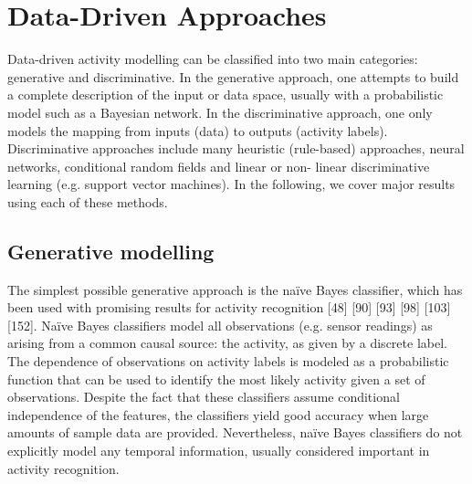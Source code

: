 \section{Data-Driven Approaches}
\label{sec:soa:datadriven}

Data-driven activity modelling can be classified into two main categories: generative and discriminative. In the generative approach, one attempts to build a complete description of the input or data space, usually with a probabilistic model such as a Bayesian network. In the discriminative approach, one only models the mapping from inputs (data) to outputs (activity labels). Discriminative approaches include many heuristic (rule-based) approaches, neural networks, conditional random fields and linear or non- linear discriminative learning (e.g. support vector machines). In the following, we cover major results using each of these methods.

\subsection{Generative modelling}

The simplest possible generative approach is the na\"ive Bayes classifier, which has been used with promising results for activity recognition [48] [90] [93] [98] [103] [152]. Na\"ive Bayes classifiers model all observations (e.g. sensor readings) as arising from a common causal source: the activity, as given by a discrete label. The dependence of observations on activity labels is modeled as a probabilistic function that can be used to identify the most likely activity given a set of observations. Despite the fact that these classifiers assume conditional independence of the features, the classifiers yield good accuracy when large amounts of sample data are provided. Nevertheless, na\"ive Bayes classifiers do not explicitly model any temporal information, usually considered important in activity recognition.

